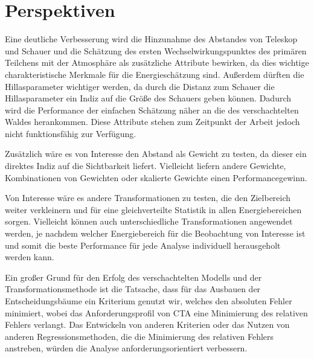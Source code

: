 \section{Perspektiven}

Eine deutliche Verbesserung wird die Hinzunahme des Abstandes von Teleskop und Schauer und die Schätzung des ersten
Wechselwirkungspunktes des primären Teilchens mit der Atmosphäre als zusätzliche Attribute bewirken, da dies wichtige
charakteristische Merkmale für die Energieschätzung sind. Außerdem dürften die Hillasparameter wichtiger werden, da durch
die Distanz zum Schauer die Hillasparameter ein Indiz auf die Größe des Schauers geben können.
Dadurch wird die Performance der einfachen Schätzung näher an die des verschachtelten Waldes herankommen.
Diese Attribute stehen zum Zeitpunkt der Arbeit jedoch nicht funktionsfähig zur Verfügung.

Zusätzlich wäre es von Interesse den Abstand als Gewicht zu testen, da dieser ein direktes Indiz auf die Sichtbarkeit
liefert.
Vielleicht liefern andere Gewichte, Kombinationen von Gewichten oder skalierte Gewichte einen Performancegewinn.

Von Interesse wäre es andere Transformationen zu testen, die den Zielbereich weiter verkleinern und für eine gleichverteilte
Statistik in allen Energiebereichen sorgen.
Vielleicht können auch unterschiedliche Transformationen angewendet werden, je nachdem welcher Energiebereich für die
Beobachtung von Interesse ist und somit die beste Performance für jede Analyse individuell herausgeholt werden kann.

Ein großer Grund für den Erfolg des verschachtelten Modells und der Transformationsmethode ist die Tatsache, dass für das
Ausbauen der Entscheidungsbäume ein Kriterium genutzt wir, welches den absoluten Fehler minimiert, wobei das Anforderungsprofil von
CTA eine Minimierung des relativen Fehlers verlangt.
Das Entwickeln von anderen Kriterien oder das Nutzen von anderen Regressionsmethoden, die die Minimierung des relativen Fehlers
anstreben, würden die Analyse anforderungsorientiert verbessern.
